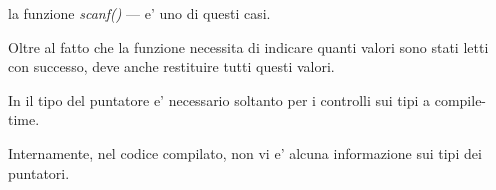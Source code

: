 la funzione \emph{scanf()} --- e' uno di questi casi.

Oltre al fatto che la funzione necessita di indicare quanti valori sono stati letti con successo, deve anche restituire tutti questi valori.

In \CCpp il tipo del puntatore e' necessario soltanto per i controlli sui tipi a compile-time.

Internamente, nel codice compilato, non vi e' alcuna informazione sui tipi dei puntatori.





